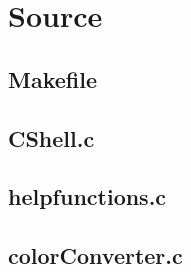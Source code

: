 \chapter{Source}
\section{Makefile}


\section{CShell.c}


\section{helpfunctions.c}


\section{colorConverter.c}
